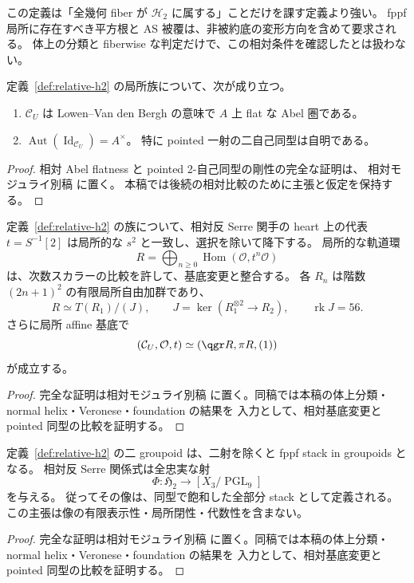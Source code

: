 この定義は「全幾何 fiber が $\mathcal H_2$ に属する」ことだけを課す定義より強い。
fppf 局所に存在すべき平方根と AS 被覆は、非被約底の変形方向を含めて要求される。
体上の分類と fiberwise な判定だけで、この相対条件を確認したとは扱わない。

\begin{lemma}
\label{lem:relative-h2-flat-center}
定義~\ref{def:relative-h2} の局所族について、次が成り立つ。
\begin{enumerate}
\item $\mathcal C_U$ は Lowen--Van den Bergh の意味で $A$ 上 flat な Abel 圏である。
\item $\operatorname{Aut}(\operatorname{Id}_{\mathcal C_U})=A^\times$。
  特に pointed 一射の二自己同型は自明である。
\end{enumerate}
\end{lemma}
\begin{proof}
相対 Abel flatness と pointed 2-自己同型の剛性の完全な証明は、
相対モジュライ別稿 \cite[相対的な対象と基底変更]{QuadricModuli2026} に置く。
本稿では後続の相対比較のために主張と仮定を保持する。
\end{proof}

\begin{proposition}
\label{prop:relative-h2-antiserre-reconstruction}
定義~\ref{def:relative-h2} の族について、相対反 Serre 関手の heart 上の代表
$t=S^{-1}[2]$ は局所的な $s^2$ と一致し、選択を除いて降下する。
局所的な軌道環
\[
 R=\bigoplus_{n\ge0}\operatorname{Hom}(\mathcal O,t^n\mathcal O)
\]
は、次数スカラーの比較を許して、基底変更と整合する。
各 $R_n$ は階数 $(2n+1)^2$ の有限局所自由加群であり、
\[
 R\simeq T(R_1)/(J),\qquad
 J=\ker(R_1^{\otimes2}\to R_2),\qquad\operatorname{rk}J=56.
\]
さらに局所 affine 基底で
\[
 (\mathcal C_U,\mathcal O,t)\simeq(\qgr R,\pi R,(1))
\]
が成立する。
\end{proposition}
\begin{proof}
完全な証明は相対モジュライ別稿
\cite[相対反 Serre 再構成と三次表示の認識]{QuadricModuli2026}
に置く。同稿では本稿の体上分類・normal helix・Veronese・foundation の結果を
入力として、相対基底変更と pointed 同型の比較を証明する。
\end{proof}

\begin{proposition}
\label{prop:relative-h2-stack-recognition}
定義~\ref{def:relative-h2} の二 groupoid は、二射を除くと
fppf stack in groupoids となる。
相対反 Serre 関係式は全忠実な射
\[
 \Phi:\mathfrak H_2\longrightarrow[X_3/\operatorname{PGL}_9]
\]
を与える。
従ってその像は、同型で飽和した全部分 stack として定義される。
この主張は像の有限表示性・局所閉性・代数性を含まない。
\end{proposition}
\begin{proof}
完全な証明は相対モジュライ別稿
\cite[相対反 Serre 再構成と三次表示の認識]{QuadricModuli2026}
に置く。同稿では本稿の体上分類・normal helix・Veronese・foundation の結果を
入力として、相対基底変更と pointed 同型の比較を証明する。
\end{proof}

